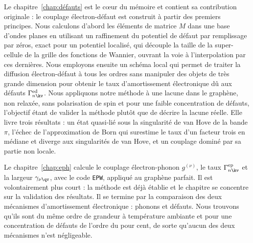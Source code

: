 Le chapitre~\ref{chap:défauts} est le c\oe ur du mémoire et contient sa contribution originale : le couplage électron-défaut est construit à partir des premiers principes. Nous calculons d'abord les éléments de matrice $M$ dans une base d'ondes planes en utilisant un raffinement du potentiel de défaut par remplissage par zéros, exact pour un potentiel localisé, qui découple la taille de la super-cellule de la grille des fonctions de Wannier, ouvrant la voie à l'interpolation par ces dernières. Nous employons ensuite un schéma local qui permet de traiter la diffusion électron-défaut à tous les ordres sans manipuler des objets de très grande dimension pour obtenir le taux d'amortissement électronique dû aux défauts $\Gamma_{n\kv}^\text{ed}$. Nous appliquons notre méthode à une lacune dans le graphène, non relaxée, sans polarisation de spin et pour une faible concentration de défauts, l'objectif étant de valider la méthode plutôt que de décrire la lacune réelle. Elle livre trois résultats : un état quasi-lié sous la singularité de van Hove de la bande $\pi$, l'échec de l'approximation de Born qui surestime le taux d'un facteur trois en médiane et diverge aux singularités de van Hove, et un couplage dominé par sa partie non locale.

Le chapitre~\ref{chap:eph} calcule le couplage électron-phonon $g^{(\nu)}$, le taux $\Gamma^\text{ep}_{n\kv}$ et la largeur $\gamma_{\nu\qv}$, avec le code \texttt{EPW}, appliqué au graphène parfait. Il est volontairement plus court : la méthode est déjà établie et le chapitre se concentre sur la validation des résultats. Il se termine par la comparaison des deux mécanismes d'amortissement électronique : phonons et défauts. Nous trouvons qu'ils sont du même ordre de grandeur à température ambiante et pour une concentration de défauts de l'ordre du pour cent, de sorte qu'aucun des deux mécanismes n'est négligeable.

